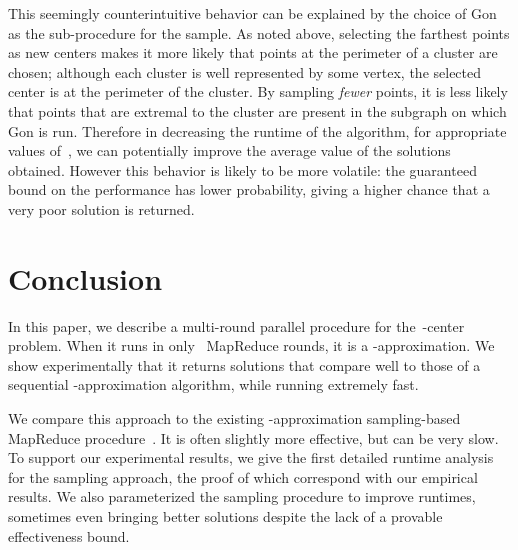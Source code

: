\documentclass[11pt]{article}
\newcommand{\ene}{{\sc EIM}\xspace}
\newcommand{\gon}{{\sc Gon}\xspace}
\begin{document}
 
This seemingly counterintuitive behavior can be explained by the choice
of \gon as the sub-procedure for the sample. 
As noted above,
selecting the farthest points as new centers makes it more likely that points
at the perimeter of a cluster are chosen; although each cluster is well
represented by some vertex, the selected center is at the perimeter of the cluster. 
By sampling \emph{fewer} points, it is less likely that points that are
extremal to the cluster are present in the subgraph on which
\gon is run.
Therefore in decreasing the runtime of the algorithm,
for appropriate values of~,
we can potentially improve the average value of the solutions obtained.
However this behavior is likely to be more volatile:
the guaranteed bound on the performance has lower probability,
giving a higher chance that a very poor solution is returned.






\section{Conclusion}
In this paper, we describe a multi-round parallel procedure for the~-center
problem.
When it runs in only~ MapReduce rounds, it is  a -approximation. 
We show experimentally that it returns solutions that compare well
to those of a sequential -approximation algorithm, while running extremely
fast. 

We compare this approach to the existing -approximation
sampling-based MapReduce procedure~\cite{ene2011fast}.
It is often slightly more effective, but can be very slow.
To support our experimental results, we give the first detailed runtime analysis for the sampling approach, the proof of which correspond with our empirical results.
We also parameterized the
sampling procedure to improve runtimes, sometimes even bringing better
solutions despite the lack of a provable effectiveness bound.



\begin{figure*}[!t]
\vspace{-7mm}
\centerline 
\hfil
{}
\hfil
{}
\caption{\small Runtimes in seconds for fixed~ over values of~ ranging
from  to .
For sufficiently small values of~ relative to~, \ene behaves identically to \gon.
The is caused by the condition on the while loop: if~ is large enough, the condition is never met and no sampling occurs,
so \gon is run on the entire data set.}
\label{fig_sim}
\end{figure*}
\end{document}
